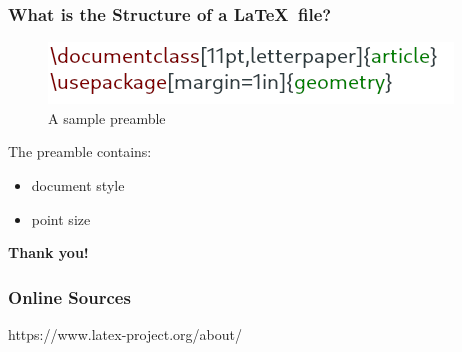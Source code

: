 \documentclass[17pt]{beamer}
\begin{document}
	\begin{frame}
		\frametitle{What is the Structure of a \LaTeX\ file?}
		
		\begin{minipage}[t]{0.49\textwidth}
			\begin{figure}
				\includegraphics[width=\linewidth]{pics/preamble}
				\caption{\footnotesize A sample preamble}
				\label{fig:preamble}
			\end{figure}
		\end{minipage}
		\footnotesize
		\begin{minipage}[t]{0.49\textwidth}
			The preamble contains:
			\begin{itemize}
				\item \pause document style
				\item \pause point size
			\end{itemize}
		\end{minipage}
		
		
	\end{frame}	

    \begin{frame}
    	\begin{center}
    		\textbf{\LARGE Thank you!}
    	\end{center}
    \end{frame}

	\begin{frame}
		\frametitle{Online Sources}
		https://www.latex-project.org/about/
		
	\end{frame}	
	
\end{document}
